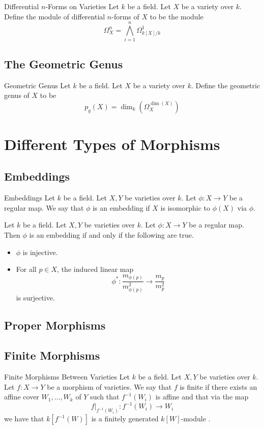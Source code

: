 \documentclass[a4paper]{article}
\begin{document}
\begin{defn}{Differential $n$-Forms on Varieties}{} Let $k$ be a field. Let $X$ be a variety over $k$. Define the module of differential $n$-forms of $X$ to be the module $$\Omega_X^n=\bigwedge_{i=1}^n\Omega_{k[X]/k}^1$$
\end{defn}

\subsection{The Geometric Genus}
\begin{defn}{Geometric Genus}{} Let $k$ be a field. Let $X$ be a variety over $k$. Define the geometric genus of $X$ to be $$p_g(X)=\dim_k\left(\Omega_X^{\dim(X)}\right)$$
\end{defn}

\pagebreak
\section{Different Types of Morphisms}
\subsection{Embeddings}
\begin{defn}{Embeddings}{} Let $k$ be a field. Let $X,Y$ be varieties over $k$. Let $\phi:X\to Y$ be a regular map. We say that $\phi$ is an embedding if $X$ is isomorphic to $\phi(X)$ via $\phi$. 
\end{defn}

\begin{prp}{}{} Let $k$ be a field. Let $X,Y$ be varieties over $k$. Let $\phi:X\to Y$ be a regular map. Then $\phi$ is an embedding if and only if the following are true. 
\begin{itemize}
\item $\phi$ is injective. 
\item For all $p\in X$, the induced linear map $$\phi^\ast:\frac{m_{\phi(p)}}{m_{\phi(p)}^2}\to\frac{m_p}{m_p^2}$$ is surjective. 
\end{itemize}
\end{prp}

\subsection{Proper Morphisms}

\subsection{Finite Morphisms}
\begin{defn}{Finite Morphisms Between Varieties}{} Let $k$ be a field. Let $X,Y$ be varieties over $k$. Let $f:X\to Y$ be a morphism of varieties. We say that $f$ is finite if there exists an affine cover $W_1,\dots,W_k$ of $Y$ such that $f^{-1}(W_i)$ is affine and that via the map $$f|_{f^{-1}(W_i)}:f^{-1}(W_i)\to W_i$$ we have that $k[f^{-1}(W)]$ is a finitely generated $k[W]$-module . 
\end{defn}
\end{document}
